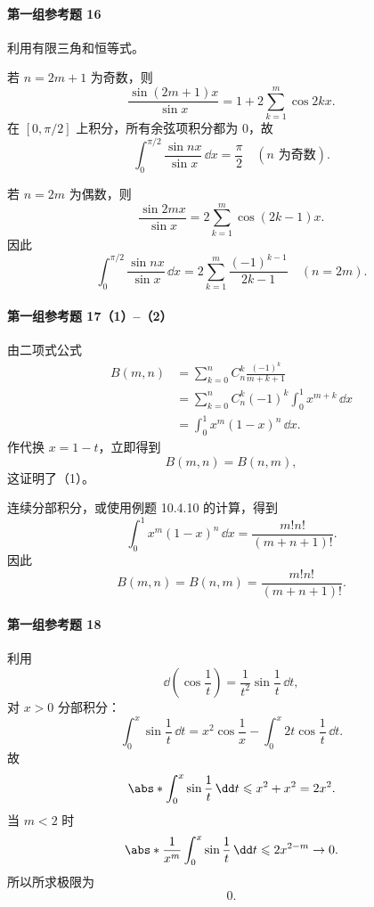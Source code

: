 \paragraph{第一组参考题 16}
\begin{xsolution}
利用有限三角和恒等式。

若 $n=2m+1$ 为奇数，则
\[
  \frac{\sin(2m+1)x}{\sin x}
  =1+2\sum_{k=1}^m\cos2kx.
\]
在 $[0,\pi/2]$ 上积分，所有余弦项积分都为 $0$，故
\[
  \boxed{\int_0^{\pi/2}\frac{\sin nx}{\sin x}\,\dd x=\frac\pi2
  \quad(n\text{ 为奇数})}.
\]

若 $n=2m$ 为偶数，则
\[
  \frac{\sin2mx}{\sin x}
  =2\sum_{k=1}^m\cos(2k-1)x.
\]
因此
\[
  \boxed{\int_0^{\pi/2}\frac{\sin nx}{\sin x}\,\dd x
  =2\sum_{k=1}^{m}\frac{(-1)^{k-1}}{2k-1}
  \quad(n=2m)}.
\]
\end{xsolution}

\paragraph{第一组参考题 17（1）--（2）}
\begin{xsolution}
由二项式公式
\begin{align*}
  B(m,n)
  &=\sum_{k=0}^nC_n^k\frac{(-1)^k}{m+k+1}\\
  &=\sum_{k=0}^nC_n^k(-1)^k\int_0^1x^{m+k}\,\dd x\\
  &=\int_0^1x^m(1-x)^n\,\dd x.
\end{align*}
作代换 $x=1-t$，立即得到
\[
  B(m,n)=B(n,m),
\]
这证明了（1）。

连续分部积分，或使用例题 10.4.10 的计算，得到
\[
  \int_0^1x^m(1-x)^n\,\dd x
  =\frac{m!n!}{(m+n+1)!}.
\]
因此
\[
  \boxed{B(m,n)=B(n,m)=\frac{m!n!}{(m+n+1)!}}.
\]
\end{xsolution}

\paragraph{第一组参考题 18}
\begin{xsolution}
利用
\[
  \dd\left(\cos\frac1t\right)
  =\frac1{t^2}\sin\frac1t\,\dd t,
\]
对 $x>0$ 分部积分：
\[
  \int_0^x\sin\frac1t\,\dd t
  =x^2\cos\frac1x-
  \int_0^x2t\cos\frac1t\,\dd t.
\]
故
\[
  \abs*{\int_0^x\sin\frac1t\,\dd t}
  \leqslant x^2+x^2=2x^2.
\]
当 $m<2$ 时
\[
  \abs*{\frac1{x^m}\int_0^x\sin\frac1t\,\dd t}
  \leqslant2x^{2-m}\to0.
\]
所以所求极限为
\[
  \boxed{0}.
\]
\end{xsolution}

